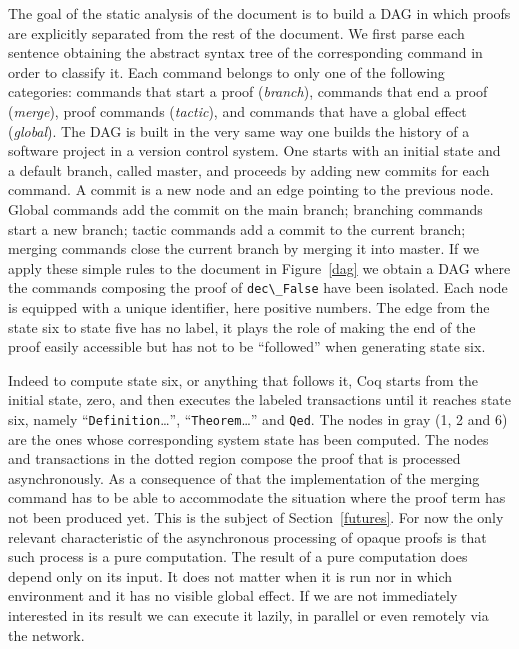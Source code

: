 \documentclass[runningheads,a4paper,oribibl]{llncs}
\newcommand{\tmverbatim}[1]{\lstinline|#1|}
\begin{document}
The goal of the static analysis of the document is to build a DAG in which
proofs are explicitly separated from the rest of the document. We first parse
each sentence
obtaining the abstract syntax tree of the corresponding
command in order to classify it. Each command belongs to only one of the
following categories: commands that start a proof ({\emph{branch}}), commands
that end a proof ({\emph{merge}}), proof commands ({\emph{tactic}}), and
commands that have a global effect ({\emph{global}}). The DAG is built in the
very same way one builds the history of a software project in a version
control system. One starts with an initial state and a default branch, called
master, and proceeds by adding new commits for each command. A commit is a new
node and an edge pointing to the previous node. Global commands add the commit
on the main branch; branching commands start a new branch; tactic commands add
a commit to the current branch; merging commands close the current branch by
merging it into master. If we apply these simple rules to the document in
Figure~\ref{dag} we obtain a DAG where the commands composing the proof of
\tmverbatim{dec\_False} have been isolated. Each node is equipped with a unique
identifier, here positive numbers. The edge from the state six to state five
has no label, it plays the role of making the end of the proof easily
accessible but has not to be ``followed'' when generating state six.

Indeed to compute state six, or anything that follows it,
Coq starts from the initial state, zero, and then executes the labeled
transactions until it reaches state six, namely
``\tmverbatim{Definition}\ldots'',
``\tmverbatim{Theorem}\ldots'' and \tmverbatim{Qed}.
The nodes in gray (1, 2 and 6) are the ones whose
corresponding system state has been computed. The nodes and transactions in
the dotted region compose the proof that is processed asynchronously. 
As a consequence of that the implementation of the
merging command has to be able to accommodate the situation where the proof
term has not been produced yet. This is the subject of Section~\ref{futures}.
For now the only relevant characteristic of the asynchronous processing of
opaque proofs is that such process is a pure computation.
The result of a pure computation does depend only on its input. It
does not
matter when it
is run nor in which environment and it has no visible global effect. If we are
not immediately interested in its result we can execute it lazily,
in parallel or even remotely via the network.
\end{document}
